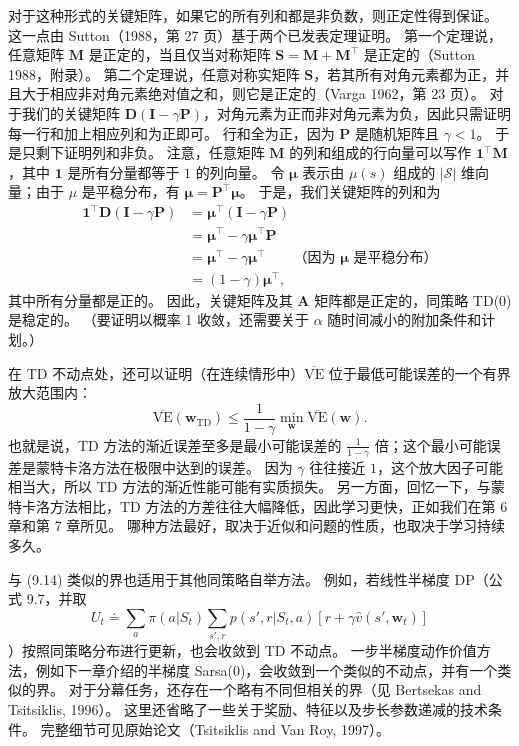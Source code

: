 \documentclass[UTF8, 12pt, fontset=fandol, oneside]{ctexart}
\begin{document}
\begin{center}
{\begin{minipage}{0.9\textwidth}
对于这种形式的关键矩阵，如果它的所有列和都是非负数，则正定性得到保证。
这一点由 Sutton（1988，第 27 页）基于两个已发表定理证明。
第一个定理说，任意矩阵 $\mathbf{M}$ 是正定的，当且仅当对称矩阵 $\mathbf{S}=\mathbf{M}+\mathbf{M}^\top$ 是正定的（Sutton 1988，附录）。
第二个定理说，任意对称实矩阵 $\mathbf{S}$，若其所有对角元素都为正，并且大于相应非对角元素绝对值之和，则它是正定的（Varga 1962，第 23 页）。
对于我们的关键矩阵 $\mathbf{D}(\mathbf{I}-\gamma\mathbf{P})$，对角元素为正而非对角元素为负，因此只需证明每一行和加上相应列和为正即可。
行和全为正，因为 $\mathbf{P}$ 是随机矩阵且 $\gamma<1$。
于是只剩下证明列和非负。
注意，任意矩阵 $\mathbf{M}$ 的列和组成的行向量可以写作 $\mathbf{1}^\top\mathbf{M}$，其中 $\mathbf{1}$ 是所有分量都等于 $1$ 的列向量。
令 $\boldsymbol{\mu}$ 表示由 $\mu(s)$ 组成的 $|\mathcal{S}|$ 维向量；由于 $\mu$ 是平稳分布，有 $\boldsymbol{\mu}=\mathbf{P}^\top\boldsymbol{\mu}$。
于是，我们关键矩阵的列和为
\begin{align*}
\mathbf{1}^\top\mathbf{D}(\mathbf{I}-\gamma\mathbf{P})
&=\boldsymbol{\mu}^\top(\mathbf{I}-\gamma\mathbf{P})\\
&=\boldsymbol{\mu}^\top-\gamma\boldsymbol{\mu}^\top\mathbf{P}\\
&=\boldsymbol{\mu}^\top-\gamma\boldsymbol{\mu}^\top
\qquad\text{（因为 $\boldsymbol{\mu}$ 是平稳分布）}\\
&=(1-\gamma)\boldsymbol{\mu}^\top,
\end{align*}
其中所有分量都是正的。
因此，关键矩阵及其 $\mathbf{A}$ 矩阵都是正定的，同策略 TD(0) 是稳定的。
（要证明以概率 1 收敛，还需要关于 $\alpha$ 随时间减小的附加条件和计划。）
\end{minipage}}
\end{center}

在 TD 不动点处，还可以证明（在连续情形中）$\overline{\mathrm{VE}}$ 位于最低可能误差的一个有界放大范围内：
\begin{equation}
\overline{\mathrm{VE}}(\mathbf{w}_{\mathrm{TD}})
\le \frac{1}{1-\gamma}\min_{\mathbf{w}}\overline{\mathrm{VE}}(\mathbf{w}).
\tag{9.14}
\end{equation}
也就是说，TD 方法的渐近误差至多是最小可能误差的 $\frac{1}{1-\gamma}$ 倍；这个最小可能误差是蒙特卡洛方法在极限中达到的误差。
因为 $\gamma$ 往往接近 $1$，这个放大因子可能相当大，所以 TD 方法的渐近性能可能有实质损失。
另一方面，回忆一下，与蒙特卡洛方法相比，TD 方法的方差往往大幅降低，因此学习更快，正如我们在第 6 章和第 7 章所见。
哪种方法最好，取决于近似和问题的性质，也取决于学习持续多久。

与 (9.14) 类似的界也适用于其他同策略自举方法。
例如，若线性半梯度 DP（公式 9.7，并取
\[
U_t\doteq \sum_a\pi(a|S_t)\sum_{s',r}p(s',r|S_t,a)\left[r+\gamma\hat{v}(s',\mathbf{w}_t)\right]
\]
）按照同策略分布进行更新，也会收敛到 TD 不动点。
一步半梯度动作价值方法，例如下一章介绍的半梯度 Sarsa(0)，会收敛到一个类似的不动点，并有一个类似的界。
对于分幕任务，还存在一个略有不同但相关的界（见 Bertsekas and Tsitsiklis, 1996）。
这里还省略了一些关于奖励、特征以及步长参数递减的技术条件。
完整细节可见原始论文（Tsitsiklis and Van Roy, 1997）。
\end{document}
